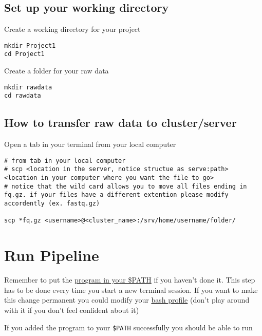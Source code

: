 \documentclass[
]{book}
\begin{document}
\hypertarget{set-up-your-working-directory}{%
\section{Set up your working directory}\label{set-up-your-working-directory}}

Create a working directory for your project

\begin{verbatim}
mkdir Project1
cd Project1
\end{verbatim}

Create a folder for your raw data

\begin{verbatim}
mkdir rawdata
cd rawdata
\end{verbatim}

\hypertarget{how-to-transfer-raw-data-to-clusterserver}{%
\section{How to transfer raw data to cluster/server}\label{how-to-transfer-raw-data-to-clusterserver}}

Open a tab in your terminal from your local computer

\begin{verbatim}
# from tab in your local computer
# scp <location in the server, notice structue as serve:path> <location in your computer where you want the file to go>
# notice that the wild card allows you to move all files ending in fq.gz. if your files have a different extention please modify accordently (ex. fastq.gz)

scp *fq.gz <username>@<cluster_name>:/srv/home/username/folder/
\end{verbatim}

\hypertarget{run-pipeline}{%
\chapter{Run Pipeline}\label{run-pipeline}}

Remember to put the \href{getting-started.}{program in your \$PATH} if you haven't done it. This step has to be done every time you start a new terminal session. If you want to make this change permanent you could modify your \href{https://stackoverflow.com/questions/14637979/how-to-permanently-set-path-on-linux-unix}{bash profile} (don't play around with it if you don't feel confident about it)

If you added the program to your \texttt{\$PATH} successfully you should be able to run
\end{document}
